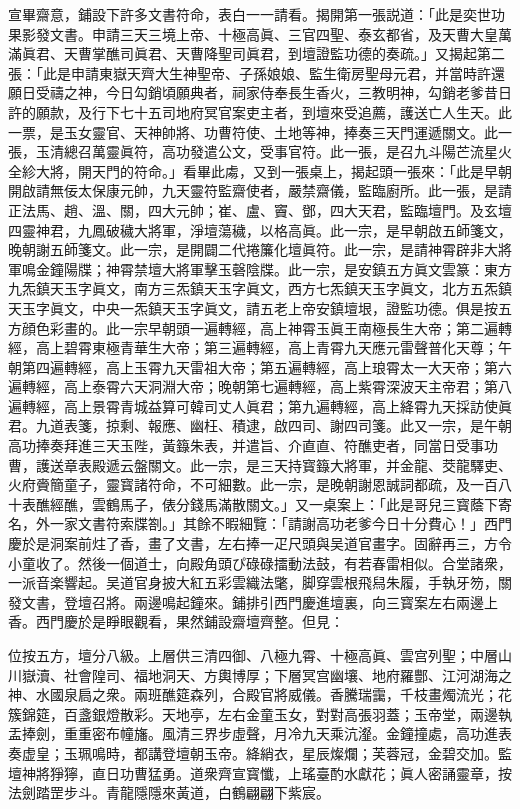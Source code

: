 宣畢齋意，鋪設下許多文書符命，表白一一請看。揭開第一張説道：「此是奕世功果影發文書。申請三天三境上帝、十極高眞、三官四聖、泰玄都省，及天曹大皇萬滿眞君、天曹掌醮司眞君、天曹降聖司眞君，到壇證監功德的奏疏。」又揭起第二張：「此是申請東嶽天齊大生神聖帝、子孫娘娘、監生衛房聖母元君，并當時許還願日受禱之神，今日勾銷頃願典者，祠家侍奉長生香火，三教明神，勾銷老爹昔日許的願款，及行下七十五司地府冥官案吏主者，到壇來受追薦，護送亡人生天。此一票，是玉女靈官、天神帥將、功曹符使、土地等神，捧奏三天門運遞關文。此一張，玉清總召萬靈眞符，高功發遣公文，受事官符。此一張，是召九斗陽芒流星火全紾大將，開天門的符命。」看畢此䖏，又到一張桌上，揭起頭一張來：「此是早朝開啟請無佞太保康元帥，九天靈符監齋使者，嚴禁齋儀，監臨廚所。此一張，是請正法馬、趙、溫、關，四大元帥；崔、盧、竇、鄧，四大天君，監臨壇門。及玄壇四靈神君，九鳳破穢大將軍，淨壇蕩穢，以格高眞。此一宗，是早朝啟五師箋文，晚朝謝五師箋文。此一宗，是開闢二代捲簾化壇眞符。此一宗，是請神霄辟非大將軍鳴金鐘陽牒；神霄禁壇大將軍擊玉磬陰牒。此一宗，是安鎮五方眞文雲篆：東方九炁鎮天玉字眞文，南方三炁鎮天玉字眞文，西方七炁鎮天玉字眞文，北方五炁鎮天玉字眞文，中央一炁鎮天玉字眞文，請五老上帝安鎮壇垠，證監功德。俱是按五方顔色彩畫的。此一宗早朝頭一遍轉經，高上神霄玉眞王南極長生大帝；第二遍轉經，高上碧霄東極青華生大帝；第三遍轉經，高上青霄九天應元雷聲普化天尊；午朝第四遍轉經，高上玉霄九天雷祖大帝；第五遍轉經，高上琅霄太一大天帝；第六遍轉經，高上泰霄六天洞淵大帝；晚朝第七遍轉經，高上紫霄深波天主帝君；第八遍轉經，高上景霄青城益算可韓司丈人眞君；第九遍轉經，高上絳霄九天採訪使眞君。九道表箋，掠剩、報應、幽枉、積逮，啟四司、謝四司箋。此又一宗，是午朝高功捧奏拜進三天玉陛，黃籙朱表，并遣旨、介直直、符醮吏者，同當日受事功曹，護送章表殿遞云盤關文。此一宗，是三天持寳籙大將軍，并金龍、茭龍驛吏、火府賫簡童子，靈寳諸符命，不可細數。此一宗，是晚朝謝恩誠詞都疏，及一百八十表醮經醮，雲鶴馬子，俵分錢馬滿散關文。」又一桌案上：「此是哥兒三寳蔭下寄名，外一家文書符索牒劄。」其餘不暇細覽：「請謝高功老爹今日十分費心！」西門慶於是洞案前炷了香，畫了文書，左右捧一疋尺頭與吴道官畫字。固辭再三，方令小童收了。然後一個道士，向殿角頭ぴ碌碌擂動法鼓，有若春雷相似。合堂諸衆，一派音楽響起。吴道官身披大紅五彩雲織法氅，脚穿雲根飛舄朱履，手執牙笏，關發文書，登壇召將。兩邊鳴起鐘來。鋪排引西門慶進壇裏，向三寳案左右兩邊上香。西門慶於是睜眼觀看，果然鋪設齋壇齊整。但見：

\begin{myquote}
位按五方，壇分八級。上層供三清四御、八極九霄、十極高眞、雲宫列聖；中層山川嶽瀆、社會隍司、福地洞天、方輿博厚；下層冥宫幽壤、地府羅酆、江河湖海之神、水國泉扃之衆。兩班醮筵森列，合殿官將威儀。香騰瑞靄，千枝畫燭流光；花簇錦筵，百盞銀燈散彩。天地亭，左右金童玉女，對對高張羽蓋；玉帝堂，兩邊執盂捧劍，重重密布幢旛。風清三界步虛聲，月冷九天乘沆瀣。金鐘撞處，高功進表奏虚皇；玉珮鳴時，都講登壇朝玉帝。絳綃衣，星辰燦爛；芙蓉冠，金碧交加。監壇神將猙獰，直日功曹猛勇。道衆齊宣寳懺，上瑤臺酌水獻花；眞人密誦靈章，按法劍踏罡步斗。青龍隱隱來黃道，白鶴翩翩下紫宸。
\end{myquote}

